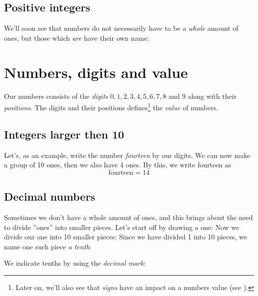 \subsection*{Positive integers}
We'll soon see that numbers do not necessarily have to be a \textsl{whole} amount of ones, but those which \textsl{are} have their own name:\regv


\newpage
\section{Numbers, digits and value}
Our numbers consists of the \textit{digits} $ 0, 1, 2 , 3, 4, 5, 6, 7, 8 $ and $ 9 $ along with their \textsl{positions}. The digits and their positions defines\footnote{Later on, we'll also see that \textit{signs} have an impact on a numbers value  (see ).} the \textit{value}  of numbers.
\subsection*{Integers larger then 10}
Let's, as an example, write the number \textsl{fourteen} by our digits.
We can now make a group of 10 ones, then we also have 4 ones. By this, we write fourteen as
\[ \text{fourteen}=14 \]
\vsk

\newpage
\subsection*{Decimal numbers}
Sometimes we don't have a whole amount of ones, and this brings about the need to divide ''ones'' into smaller pieces. Let's start off by drawing a one:
Now we divide our one into 10 smaller pieces:
Since we have divided 1 into 10 pieces, we name one such piece \textit{a tenth}:
\begin{comment}
\eks{\vs
	\fig{maal2}
	\fig{des2}
}\vsk
\end{comment}
We indicate tenths by using the \textit{decimal mark}:   
\regv
{}
\newpage
